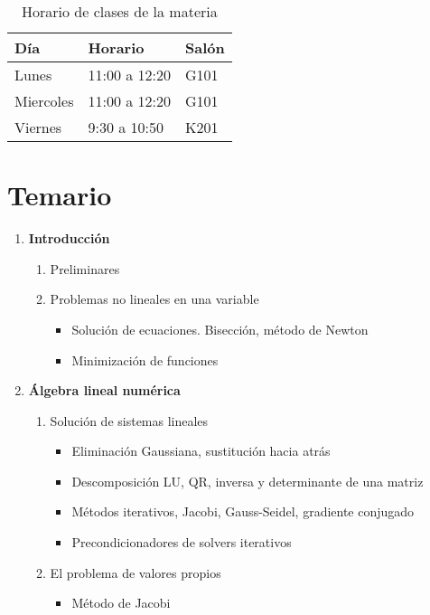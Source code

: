 \begin{table}[H]
	\centering
	\begin{tabular}{lll} \hline
		Día       & Horario       & Salón \\ \hline
		Lunes     & 11:00 a 12:20 & G101  \\
		Miercoles & 11:00 a 12:20 & G101  \\
		Viernes   & 9:30 a 10:50  & K201  \\ \hline
	\end{tabular}
	\caption{Horario de clases de la materia}
\end{table}

\section*{Temario}
\begin{enumerate}
	\item \textbf{Introducción}
	      \begin{enumerate}
		      \item Preliminares
		      \item Problemas no lineales en una variable
		            \begin{itemize}
			            \item Solución de ecuaciones. Bisección, método de Newton
			            \item Minimización de funciones
		            \end{itemize}
	      \end{enumerate}
	\item \textbf{Álgebra lineal numérica}
	      \begin{enumerate}
		      \item Solución de sistemas lineales
		            \begin{itemize}
			            \item Eliminación Gaussiana, sustitución hacia atrás
			            \item Descomposición LU, QR, inversa y determinante de una matriz
			            \item Métodos iterativos, Jacobi, Gauss-Seidel, gradiente conjugado
			            \item Precondicionadores de solvers iterativos
		            \end{itemize}
		      \item El problema de valores propios
		            \begin{itemize}
			            \item Método de Jacobi

\end{itemize}
\end{enumerate}
\end{enumerate}
